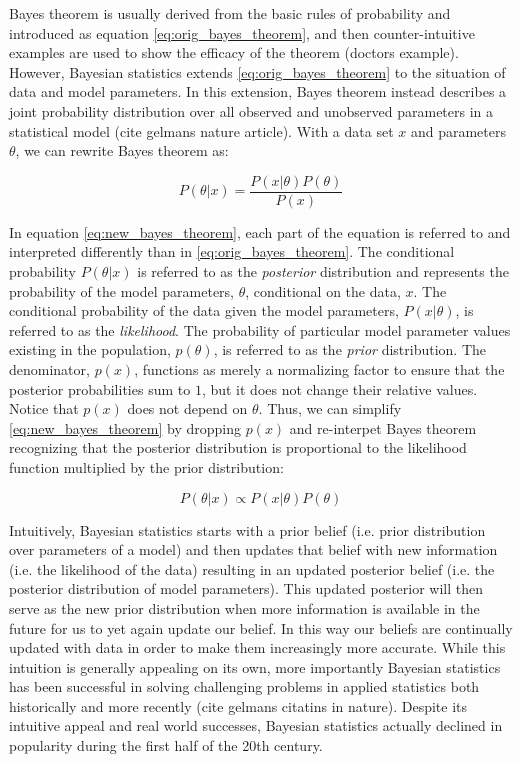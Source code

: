 Bayes theorem is usually derived from the basic rules of probability and introduced as equation \ref{eq:orig_bayes_theorem}, and then counter-intuitive examples are used to show the efficacy of the theorem (doctors example). However, Bayesian statistics extends \ref{eq:orig_bayes_theorem} to the situation of data and model parameters. In this extension, Bayes theorem instead describes a joint probability distribution over all observed and unobserved parameters in a statistical model (cite gelmans nature article). With a data set $x$ and parameters $\theta$, we can rewrite Bayes theorem as:

\begin{equation} \label{eq:new_bayes_theorem}
P(\theta|x) = \frac{P(x|\theta)P(\theta)}{P(x)}
\end{equation}

In equation \ref{eq:new_bayes_theorem}, each part of the equation is referred to and interpreted differently than in \ref{eq:orig_bayes_theorem}. The conditional probability $P(\theta|x)$ is referred to as the \textit{posterior} distribution and represents the probability of the model parameters, $\theta$, conditional on the data, $x$. The conditional probability of the data given the model parameters, $P(x|\theta)$, is referred to as the \textit{likelihood}. The probability of particular model parameter values existing in the population, $p(\theta)$, is referred to as the \textit{prior} distribution. The denominator, $p(x)$, functions as merely a normalizing factor to ensure that the posterior probabilities sum to $1$, but it does not change their relative values. Notice that $p(x)$ does not depend on $\theta$. Thus, we can simplify \ref{eq:new_bayes_theorem} by dropping $p(x)$ and re-interpet Bayes theorem recognizing that the posterior distribution is proportional to the likelihood function multiplied by the prior distribution:

\begin{equation} \label{eq:proportional_bayes_theorem}
P(\theta|x) \propto P(x|\theta)P(\theta)
\end{equation}

Intuitively, Bayesian statistics starts with a prior belief (i.e. prior distribution over parameters of a model) and then updates that belief with new information (i.e. the likelihood of the data) resulting in an updated posterior belief (i.e. the posterior distribution of model parameters). This updated posterior will then serve as the new prior distribution when more information is available in the future for us to yet again update our belief. In this way our beliefs are continually updated with data in order to make them increasingly more accurate. While this intuition is generally appealing on its own, more importantly Bayesian statistics has been successful in solving challenging problems in applied statistics both historically and more recently (cite gelmans citatins in nature). Despite its intuitive appeal and real world successes, Bayesian statistics actually declined in popularity during the first half of the 20th century.

